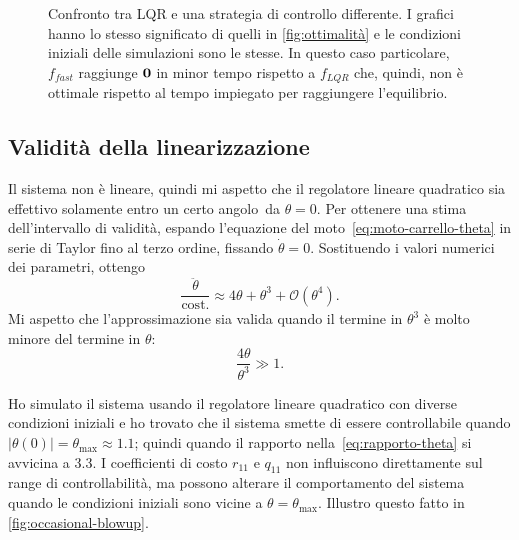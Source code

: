 \begin{figure}
    \caption[Confronto tra LQR e un controllo più rapido]{
        Confronto tra LQR e una strategia di controllo differente.
        I grafici hanno lo stesso significato di quelli in \autoref{fig:ottimalità}
        e le condizioni iniziali delle simulazioni sono le stesse.
        In questo caso particolare, $f_{fast}$ raggiunge $\mathbf{0}$ in minor
        tempo rispetto a $f_{LQR}$ che, quindi, non è ottimale rispetto
        al tempo impiegato per raggiungere l'equilibrio.
    }
    \label{fig:non-ottimalità}
\end{figure}

\subsection{Validità della linearizzazione}
Il sistema non è lineare, quindi mi aspetto che il regolatore lineare quadratico sia
effettivo solamente entro un certo angolo\footnotemark\ da $\theta = 0$.
Per ottenere una stima dell'intervallo di validità, espando l'equazione del
moto~\eqref{eq:moto-carrello-theta} in serie di Taylor fino al terzo ordine,
fissando $\dot \theta = 0$.
Sostituendo i valori numerici dei parametri, ottengo
\begin{equation*}
    \frac {\ddot \theta} {\text{cost.}} \approx 4 \theta + \theta^3 + \mathcal O(\theta^4).
\end{equation*}
Mi aspetto che l'approssimazione sia valida quando il termine in $\theta^3$ è
molto minore del termine in $\theta$:
\begin{equation}
    \frac{4\theta} {\theta^3} \gg 1.
    \label{eq:rapporto-theta}
\end{equation}


Ho simulato il sistema usando il regolatore lineare quadratico
con diverse condizioni iniziali e ho trovato che
il sistema smette di essere controllabile quando $|\theta(0)| = \theta_{\max} \approx 1.1$;
quindi quando il rapporto nella~\eqref{eq:rapporto-theta} si avvicina a $3.3$.
I coefficienti di costo $r_{11}$ e $q_{11}$ non influiscono
direttamente sul range di controllabilità, ma possono alterare
il comportamento del sistema quando le condizioni iniziali sono
vicine a $\theta = \theta_{\max}$.
Illustro questo fatto in \autoref{fig:occasional-blowup}.

